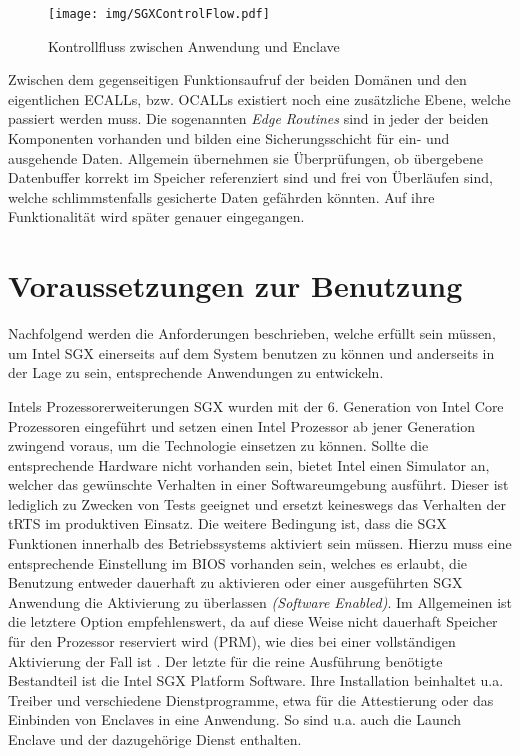 \begin{figure}[h]
	\texttt{[image: img/SGXControlFlow.pdf]}
	\centering
	\caption{Kontrollfluss zwischen Anwendung und Enclave}
	\label{fig:sgxcontrolflow}
\end{figure}

Zwischen dem gegenseitigen Funktionsaufruf der beiden Domänen und den eigentlichen ECALLs, bzw. OCALLs existiert noch eine zusätzliche Ebene, welche passiert werden muss. Die sogenannten \textit{Edge Routines} sind in jeder der beiden Komponenten vorhanden und bilden eine Sicherungsschicht für ein- und ausgehende Daten. Allgemein übernehmen sie Überprüfungen, ob übergebene Datenbuffer korrekt im Speicher referenziert sind und frei von Überläufen sind, welche schlimmstenfalls gesicherte Daten gefährden könnten. Auf ihre Funktionalität wird später genauer eingegangen.

\section{Voraussetzungen zur Benutzung}

Nachfolgend werden die Anforderungen beschrieben, welche erfüllt sein müssen, um Intel SGX einerseits auf dem System benutzen zu können und anderseits in der Lage zu sein, entsprechende Anwendungen zu entwickeln.

Intels Prozessorerweiterungen SGX wurden mit der 6. Generation von Intel Core Prozessoren eingeführt und setzen einen Intel Prozessor ab jener Generation zwingend voraus, um die Technologie einsetzen zu können. Sollte die entsprechende Hardware nicht vorhanden sein, bietet Intel einen Simulator an, welcher das gewünschte Verhalten in einer Softwareumgebung ausführt. Dieser ist lediglich zu Zwecken von Tests geeignet und ersetzt keineswegs das Verhalten der tRTS im produktiven Einsatz. Die weitere Bedingung ist, dass die SGX Funktionen innerhalb des Betriebssystems aktiviert sein müssen. Hierzu muss eine entsprechende Einstellung im BIOS vorhanden sein, welches es erlaubt, die Benutzung entweder dauerhaft zu aktivieren oder einer ausgeführten SGX Anwendung die Aktivierung zu überlassen \textit{(Software Enabled)}. Im Allgemeinen ist die letztere Option empfehlenswert, da auf diese Weise nicht dauerhaft Speicher für den Prozessor reserviert wird (PRM), wie dies bei einer vollständigen Aktivierung der Fall ist \cite{SGXDetection}. Der letzte für die reine Ausführung benötigte Bestandteil ist die Intel SGX Platform Software. Ihre Installation beinhaltet u.a. Treiber und verschiedene Dienstprogramme, etwa für die Attestierung oder das Einbinden von Enclaves in eine Anwendung. So sind u.a. auch die Launch Enclave und der dazugehörige Dienst enthalten.

